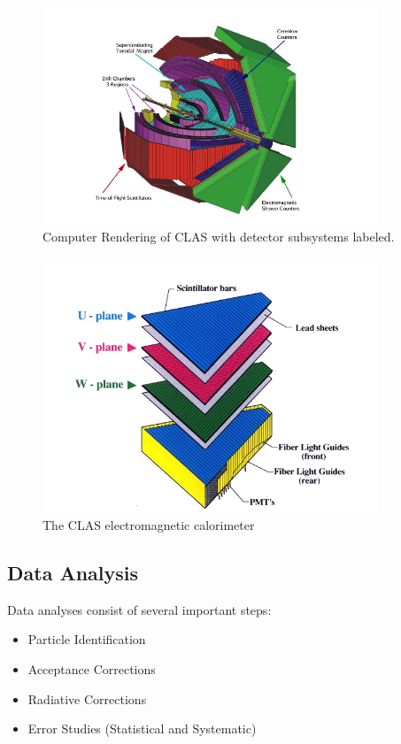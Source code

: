 \begin{figure}
  \centering
  \includegraphics[width=10cm]{image/clas.png}
  \caption{ Computer Rendering of CLAS with detector subsystems labeled.}
  \label{fig:clas}
\end{figure}

\begin{figure}
  \centering
  \includegraphics[width=10cm]{image/ec.png}
  \caption{The CLAS electromagnetic calorimeter}
  \label{fig:ec_clas}
\end{figure}

\subsection{Data Analysis}
Data analyses consist of several important steps:

\begin{itemize}
\item Particle Identification
\item Acceptance Corrections
\item Radiative Corrections
\item Error Studies (Statistical and Systematic)
\end{itemize}

